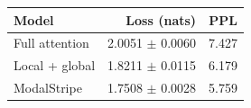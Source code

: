 \begin{tabular}{lrr}\toprule
Model & Loss (nats) & PPL\\\midrule
Full attention & 2.0051 $\pm$ 0.0060 & 7.427 \\
Local + global & 1.8211 $\pm$ 0.0115 & 6.179 \\
ModalStripe & 1.7508 $\pm$ 0.0028 & 5.759 \\
\bottomrule\end{tabular}
